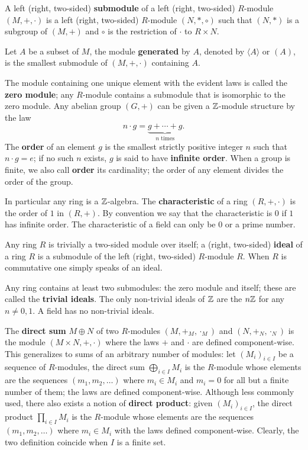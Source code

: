 A left
(right,
two-sided) \textbf{submodule} of a left
(right, two-sided) $R$-module $(M,+,\cdot)$ is a left (right, two-sided)
$R$-module $(N,\ast,\circ)$ such that $(N,\ast)$ is a subgroup of
$(M,+)$ and $\circ$ is the restriction of $\cdot$ to $R\times N$.

Let $A$ be a subset of $M$, the module
\textbf{generated}
by $A$, denoted by $\langle A\rangle$ or $(A)$, is the smallest
submodule of $(M,+,\cdot)$ containing $A$.

The module containing one unique element with the evident laws is
called the \textbf{zero module}; any
$R$-module contains a submodule that is isomorphic to the zero module.
Any abelian group $(G,+)$ can be given a $\mathbb{Z}$-module structure by the
law
\[n\cdot g = \underbrace{g + \cdots + g}_{n\text{ times}} \text{.}\]
The \textbf{order} of an element $g$ is the
smallest strictly positive integer $n$ such that $n\cdot g=e$; if no
such $n$ exists, $g$ is said to have
\textbf{infinite order}. When a group is finite,
we also call \textbf{order} its cardinality;
the order of any element divides the order of the group.

In particular any ring is a $\mathbb{Z}$-algebra. The
\textbf{characteristic} of a ring $(R,+,\cdot)$
is the order of $1$ in $(R,+)$. By convention we say that the
characteristic is $0$ if $1$ has infinite order. The characteristic of
a field can only be $0$ or a prime number.

Any ring $R$ is trivially a two-sided module over itself; a
 (right,
two-sided) \textbf{ideal} of a ring $R$ is a
submodule of the left (right, two-sided) $R$-module $R$.  When $R$ is
commutative one simply speaks of an ideal.  

Any ring contains at least two submodules: the zero module and itself;
these are called the \textbf{trivial ideals}. The
only non-trivial ideals of $\mathbb{Z}$ are the $n\mathbb{Z}$ for any $n\ne0,1$. A
field has no non-trivial ideals.

The \textbf{direct sum} $M\oplus N$ of two
$R$-modules $(M,+_M,\cdot_M)$ and $(N,+_N,\cdot_N)$ is the module
$(M\times N,+,\cdot)$ where the laws $+$ and $\cdot$ are defined
component-wise. This generalizes to sums of an arbitrary number of
modules: let $(M_i)_{i\in I}$ be a sequence of $R$-modules, the direct
sum $\bigoplus_{i\in I}M_i$ is the $R$-module whose elements are the
sequences $(m_1,m_2,\ldots)$ where $m_i\in M_i$ and $m_i=0$ for all
but a finite number of them; the laws are defined component-wise.
Although less commonly used, there also exists a notion of
\textbf{direct product}: given $(M_i)_{i\in I}$,
the direct product $\prod_{i\in I}M_i$ is the $R$-module whose
elements are the sequences $(m_1,m_2,\ldots)$ where $m_i\in M_i$ with
the laws defined component-wise. Clearly, the two definition coincide
when $I$ is a finite set.

